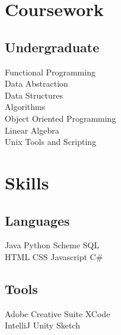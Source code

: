 \documentclass[]{deedy-resume-openfont}
\begin{document}
\begin{minipage}[t]{0.33\textwidth}
\section{Coursework}
\subsection{Undergraduate}
Functional Programming \\
Data Abstraction \\
Data Structures \\
Algorithms \\
Object Oriented Programming \\
Linear Algebra \\
Unix Tools and Scripting \\
\sectionsep


\section{Skills}
\subsection{Languages}
Java \textbullet{}   Python \textbullet{} Scheme \textbullet{} SQL \\
HTML \textbullet{} CSS \textbullet{} Javascript \textbullet{} C\# \\ 
\sectionsep
\subsection{Tools}
Adobe Creative Suite \textbullet{} XCode \\
IntelliJ \textbullet{} Unity \textbullet{} Sketch
\sectionsep

%
%

\end{minipage} 
\hfill
\end{document}
